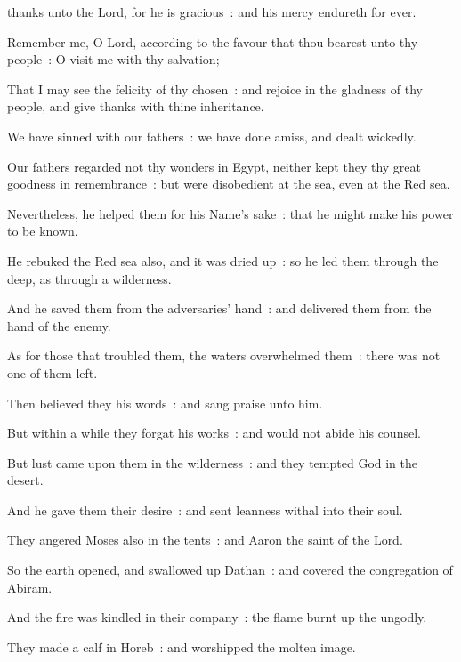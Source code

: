  thanks unto the Lord, for he is gracious~: and his mercy endureth for ever.\par
{}
Remember me, O Lord, according to the favour that thou bearest unto thy people~: O visit me with thy salvation;\par
{}That I may see the felicity of thy chosen~: and rejoice in the gladness of thy people, and give thanks with thine inheritance.\par
{}We have sinned with our fathers~: we have done amiss, and dealt wickedly.\par
{}Our fathers regarded not thy wonders in Egypt, neither kept they thy great goodness in remembrance~: but were disobedient at the sea, even at the Red sea.\par
{}Nevertheless, he helped them for his Name's sake~: that he might make his power to be known.\par
{}He rebuked the Red sea also, and it was dried up~: so he led them through the deep, as through a wilderness.\par
{}And he saved them from the adversaries' hand~: and delivered them from the hand of the enemy.\par
{}As for those that troubled them, the waters overwhelmed them~: there was not one of them left.\par
{}Then believed they his words~: and sang praise unto him.\par
{}But within a while they forgat his works~: and would not abide his counsel.\par
{}But lust came upon them in the wilderness~: and they tempted God in the desert.\par
{}And he gave them their desire~: and sent leanness withal into their soul.\par
{}They angered Moses also in the tents~: and Aaron the saint of the Lord.\par
{}So the earth opened, and swallowed up Dathan~: and covered the congregation of Abiram.\par
{}And the fire was kindled in their company~: the flame burnt up the ungodly.\par
{}They made a calf in Horeb~: and worshipped the molten image.\par
